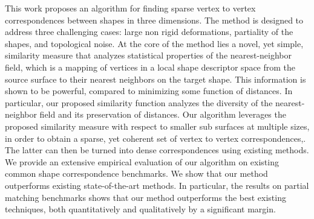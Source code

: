 This work proposes an algorithm for finding sparse vertex to vertex correspondences between shapes in three dimensions. The method is designed to address three challenging cases: large non rigid deformations, partiality of the shapes, and topological noise. 
At the core of the method lies a novel, yet simple, similarity measure that analyzes statistical properties of the nearest-neighbor field, which is a mapping of vertices in a local shape descriptor space from the source surface to their nearest neighbors on the target shape. This information is shown to be powerful, compared to minimizing some function of distances. In particular, our proposed similarity function analyzes the diversity of the nearest-neighbor field and its preservation of distances. 
Our algorithm leverages the proposed similarity measure with respect to smaller sub surfaces at multiple sizes, in order to obtain a sparse, yet coherent set of vertex to vertex correspondences,. The latter can then be turned into dense correspondences using existing methods. 
We provide an extensive empirical evaluation of our algorithm on existing common shape correspondence benchmarks. We show that our method outperforms  existing state-of-the-art methods. In particular,  the results on partial matching benchmarks shows that our method outperforms the best existing techniques, both quantitatively and qualitatively by a significant margin.